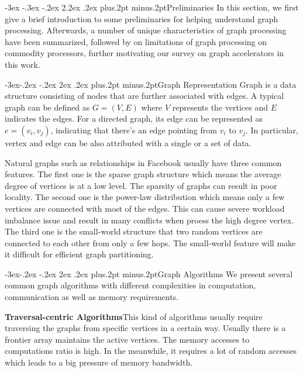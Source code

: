 \documentclass[twoside]{article}
\makeatletter
\def\section{\@startsection{section}{1}{\z@}%
 {-3ex \@plus -.3ex \@minus -.2ex}%
 {2.2ex \@plus.2ex}%
{\normalfont\normalsize\protect\baselineskip=14.5pt plus.2pt minus.2pt\bfseries}}
\def\subsection{\@startsection{subsection}{2}{\z@}%
 {-3ex\@plus -.2ex \@minus -.2ex}%
 {2ex \@plus.2ex}%
{\normalfont\normalsize\protect\baselineskip=12.5pt plus.2pt minus.2pt\bfseries}}
\makeatother
\begin{document}
\begin{multicols}{2}
\section{Preliminaries}
In this section, we first give a brief introduction to some preliminaries for helping understand graph processing. Afterwards, a number of unique characteristics of graph processing have been summarized, followed by on limitations of graph processing on commodity processors, further motivating our survey on graph accelerators in this work.

\subsection{Graph Representation}
Graph is a data structure consisting of nodes that are further associated with edges. A typical graph can be defined as $G = (V, E)$ where $V$ represents the vertices and $E$ indicates the edges. For a directed graph, its edge can be represented as $e=(v_i, v_j)$, indicating that there's an edge pointing from $v_i$ to $v_j$. In particular, vertex and edge can be also attributed with a single or a set of data.

Natural graphs such as relationships in Facebook usually have three common features. The first one is the sparse graph structure which means the average degree of vertices is at a low level. The sparsity of graphs can result in poor locality. The second one is the power-law distribution which means only a few vertices are connected with most of the edges. This can cause severe workload imbalance issue and result in many conflicts when proess the high degree vertex. The third one is the small-world structure that two random vertices are connected to each other from only a few hops. The small-world feature will make it difficult for efficient graph partitioning.

\subsection{Graph Algorithms}
We present several common graph algorithms with different complexities in computation, communication as well as memory requirements.

{\bf Traversal-centric Algorithms}\quad This kind of algorithms usually require traversing the graphs from specific vertices in a certain way. Usually there is a frontier array maintains the active vertices. The memory accesses to computations ratio is high. In the meanwhile, it requires a lot of random accesses which leads to a big pressure of memory bandwidth. 


\end{multicols}
\end{document}
